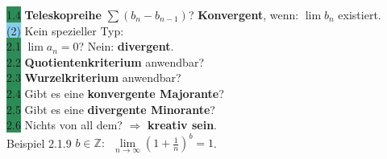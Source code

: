 \documentclass[10pt]{article}
\begin{document}
        \indent\indent \colorbox{SeaGreen}{1.4} \textbf{Teleskopreihe} 
                \textcolor{NavyBlue}{$\sum(b_n-b_{n-1})$}? 
                \textbf{Konvergent}, wenn: 
                \textcolor{NavyBlue}{$\lim b_n$} existiert.\\
        \indent \colorbox{SkyBlue}{(2)} Kein spezieller Typ:\\
        \indent\indent \colorbox{SeaGreen}{2.1} \textcolor{NavyBlue}{$\lim a_n=0$}? 
                Nein: \textbf{divergent}.\\
        \indent\indent \colorbox{SeaGreen}{2.2} \textbf{Quotientenkriterium} anwendbar?\\
        \indent\indent \colorbox{SeaGreen}{2.3} \textbf{Wurzelkriterium} anwendbar?\\
        \indent\indent \colorbox{SeaGreen}{2.4} Gibt es eine \textbf{konvergente Majorante}?\\
        \indent\indent \colorbox{SeaGreen}{2.5} Gibt es eine \textbf{divergente Minorante}?\\
        \indent\indent \colorbox{SeaGreen}{2.6} Nichts von all dem?
                $\Longrightarrow$ \textbf{kreativ sein}.\\
\colorbox{Dandelion}{Beispiel 2.1.9} \textcolor{NavyBlue}{$b\in\mathbb{Z}:\enspace
                \lim\limits_{n\to\infty}(1+\frac{1}{n})^b=1$}.
\end{document}
